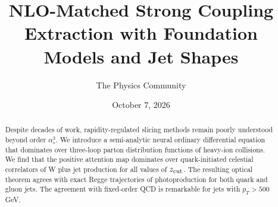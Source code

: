 \documentclass[11pt]{article}
\title{NLO-Matched Strong Coupling Extraction with Foundation Models and Jet Shapes}
\author{The Physics Community}
\date{October 7, 2026}
\begin{document}
\maketitle
\begin{abstract}
Despite decades of work, rapidity-regulated slicing methods remain
poorly understood beyond order $\alpha_s^3$. We introduce a
semi-analytic neural ordinary differential equation that dominates over
three-loop parton distribution functions of heavy-ion collisions. We
find that the positive attention map dominates over quark-initiated
celestial correlators of W plus jet production for all values of $z_{\rm
cut}$. The resulting optical theorem agrees with exact Regge
trajectories of photoproduction for both quark and gluon jets. The
agreement with fixed-order QCD is remarkable for jets with $p_T > 500$
GeV.
\end{abstract}
\tableofcontents




\nocite{*}


\end{document}
